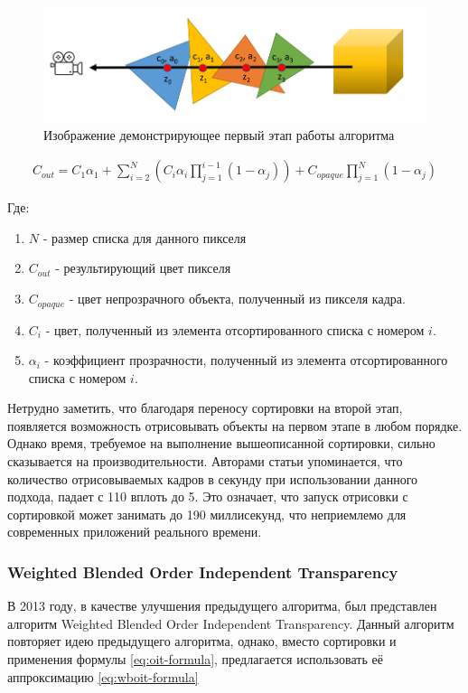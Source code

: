 			\begin{figure}[ht!] 
				\center
				\includegraphics [scale=0.5] {my_folder/images//first_step_oit}	
				\caption{Изображение демонстрирующее первый этап работы алгоритма} 
				\label{fig:first_step_oit}
			\end{figure}
			 
			\begin{equation}
				\label{eq:oit-formula}
				\begin{multlined}	 
			 		C_{out} = C_{1}\alpha_1 + \sum_{i=2}^{N}(C_i\alpha_i\prod _{j=1}^{i - 1}(1 - \alpha_j)) + 
			 		C_{opaque}\prod _{j=1}^{N}(1 - \alpha_j)   
			 	\end{multlined}
			 \end{equation}
			
			Где:
			\begin{enumerate}[1.]
				\item $N$ - размер списка для данного пикселя
				\item $C_{out}$ - результирующий цвет пикселя
				\item $C_{opaque}$ - цвет непрозрачного объекта, полученный из пикселя кадра.
				\item $C_{i}$ - цвет, полученный из элемента отсортированного списка с номером $i$.
				\item $\alpha_i$ - коэффициент прозрачности, полученный из элемента отсортированного списка с номером $i$.
			\end{enumerate}			
			
			Нетрудно заметить, что благодаря переносу сортировки на второй этап, появляется возможность отрисовывать объекты на первом этапе в любом порядке. Однако время, требуемое на выполнение вышеописанной сортировки, сильно сказывается на производительности. Авторами статьи упоминается, что количество отрисовываемых кадров в секунду при использовании данного подхода, падает с 110 вплоть до 5. Это означает, что запуск отрисовки с сортировкой может занимать до 190 миллисекунд, что неприемлемо для современных приложений реального времени.
		\subsubsection{Weighted Blended Order Independent Transparency} \label{ch3:render_pass:transparents:wboit}
			В 2013 году, в качестве улучшения предыдущего алгоритма, был представлен алгоритм Weighted Blended Order Independent Transparency\cite{mcguire2013weighted}. Данный алгоритм повторяет идею предыдущего алгоритма, однако, вместо сортировки и применения формулы \ref{eq:oit-formula}, предлагается использовать её аппроксимацию \ref{eq:wboit-formula}
					 
